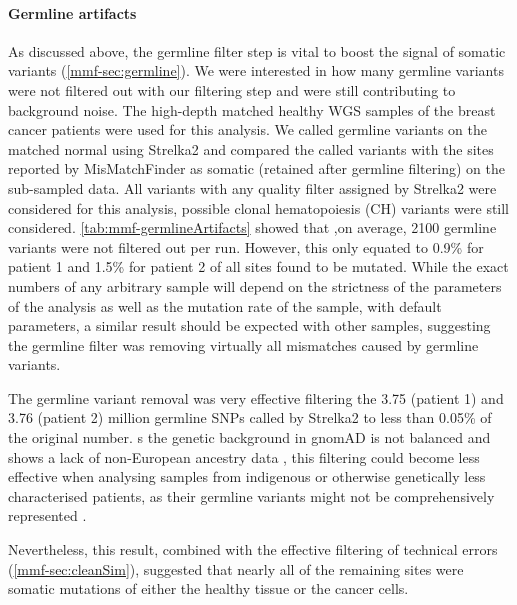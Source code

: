 \paragraph{Germline artifacts}
\label{mmf-sec:germlineArtifacts}
As discussed above, the germline filter step is vital to boost the signal of somatic variants (\autoref{mmf-sec:germline}). We were interested in how many germline variants were not filtered out with our filtering step and were still contributing to background noise. The high-depth matched healthy WGS samples of the breast cancer patients were used for this analysis. We called germline variants on the matched normal using Strelka2 and compared the called variants with the sites reported by MisMatchFinder as somatic (retained after germline filtering) on the sub-sampled data. All variants with any quality filter assigned by Strelka2 were considered for this analysis,  possible clonal hematopoiesis (CH) variants were still considered. \autoref{tab:mmf-germlineArtifacts} showed that ,on average, 2100 germline variants were not filtered out per run. However, this only equated to 0.9\% for patient 1 and 1.5\% for patient 2 of all sites found to be mutated. While the exact numbers of any arbitrary sample will depend on the strictness of the parameters of the analysis as well as the mutation rate of the sample, with default parameters, a similar result should be expected with other samples, suggesting the germline filter was removing virtually all mismatches caused by germline variants.

The germline variant removal was  very effective filtering the 3.75 (patient 1) and 3.76 (patient 2) million germline SNPs called by Strelka2 to less than 0.05\% of the original number. s the genetic background in gnomAD is not balanced and shows a lack of non-European ancestry data \cite{Tiao2020}, this filtering could become less effective when analysing samples from indigenous or otherwise genetically less characterised patients, as their germline variants might not be comprehensively represented \cite{Nassar2022}.

Nevertheless, this result, combined with the effective filtering of technical errors (\autoref{mmf-sec:cleanSim}), suggested that nearly all of the remaining sites were somatic mutations of either the healthy tissue or the cancer cells.

